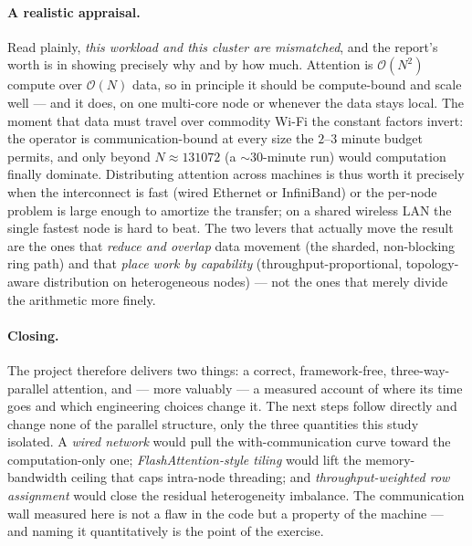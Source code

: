 \documentclass[11pt,a4paper]{article}
\begin{document}
\paragraph{A realistic appraisal.} Read plainly, \emph{this workload and this
cluster are mismatched}, and the report's worth is in showing precisely why and by
how much. Attention is $\mathcal{O}(N^2)$ compute over $\mathcal{O}(N)$ data, so in
principle it should be compute-bound and scale well --- and it does, on one
multi-core node or whenever the data stays local. The moment that data must travel
over commodity Wi-Fi the constant factors invert: the operator is communication-bound
at every size the $2$--$3$ minute budget permits, and only beyond $N\approx131072$
(a $\sim\!30$-minute run) would computation finally dominate. Distributing attention
across machines is thus worth it precisely when the interconnect is fast (wired
Ethernet or InfiniBand) or the per-node problem is large enough to amortize the
transfer; on a shared wireless LAN the single fastest node is hard to beat. The two
levers that actually move the result are the ones that \emph{reduce and overlap}
data movement (the sharded, non-blocking ring path) and that \emph{place work by
capability} (throughput-proportional, topology-aware distribution on heterogeneous
nodes) --- not the ones that merely divide the arithmetic more finely.

\paragraph{Closing.} The project therefore delivers two things: a correct,
framework-free, three-way-parallel attention, and --- more valuably --- a measured
account of where its time goes and which engineering choices change it. The next
steps follow directly and change none of the parallel structure, only the three
quantities this study isolated. A \emph{wired network} would pull the
with-communication curve toward the computation-only one; \emph{FlashAttention-style
tiling} would lift the memory-bandwidth ceiling that caps intra-node threading; and
\emph{throughput-weighted row assignment} would close the residual heterogeneity
imbalance. The communication wall measured here is not a flaw in the code but a
property of the machine --- and naming it quantitatively is the point of the
exercise.

\appendix
\end{document}
